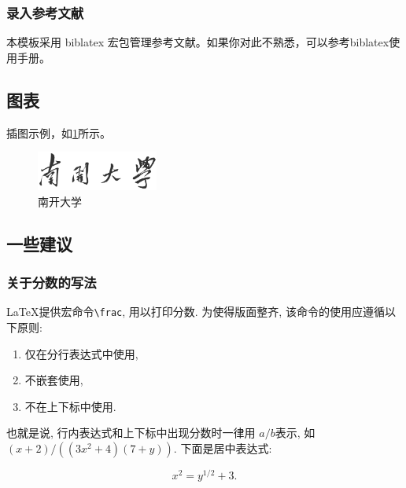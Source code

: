 \documentclass{nktba}
\begin{document}
\subsubsection{录入参考文献}

本模板采用 biblatex 宏包管理参考文献。如果你对此不熟悉，可以参考biblatex使用手册。

\subsection{图表}

插图示例，如\ref{fig:nku}所示。

\begin{figure}
\centering
\includegraphics[viewport=0 0 2984 969,width=40mm]{figures/nankaidaxue.pdf}
\caption{南开大学}
\label{fig:nku}
\end{figure}

\subsection{一些建议}
\subsubsection{关于分数的写法}

\LaTeX 提供宏命令\verb+\frac+, 用以打印分数. 为使得版面整齐, 该命令的使用应遵循以下原则:

\begin{enumerate}
\item 仅在分行表达式中使用,
\item 不嵌套使用,
\item 不在上下标中使用.
\end{enumerate}

也就是说, 行内表达式和上下标中出现分数时一律用 $a/b$表示, 如
$(x+2)/((3x^2+4)(7+y))$. 下面是居中表达式:

\[
 x^2 = y^{1/2} +3.
\]
\end{document}
